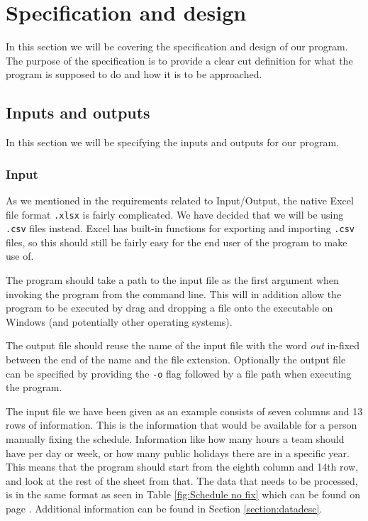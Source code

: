 \section{Specification and design}
In this section we will be covering the specification and design of our program. The purpose of the specification is to provide a clear cut definition for what the program is supposed to do and how it is to be approached.

\subsection{Inputs and outputs}
In this section we will be specifying the inputs and outputs for our program.

\subsubsection{Input}\label{InputSpec}
As we mentioned in the requirements related to Input/Output, the native Excel file format \verb|.xlsx| is fairly complicated. We have decided that we will be using \verb|.csv| files instead. Excel has built-in functions for exporting and importing \verb|.csv| files, so this should still be fairly easy for the end user of the program to make use of.

The program should take a path to the input file as the first argument when invoking the program from the command line. This will in addition allow the program to be executed by drag and dropping a file onto the executable on Windows (and potentially other operating systems).

The output file should reuse the name of the input file with the word \textit{out} in-fixed between the end of the name and the file extension. Optionally the output file can be specified by providing the \verb|-o| flag followed by a file path when executing the program.

The input file we have been given as an example consists of seven columns and 13 rows of information. This is the information that would be available for a person manually fixing the schedule. Information like how many hours a team should have per day or week, or how many public holidays there are in a specific year. This means that the program should start from the eighth column and 14th row, and look at the rest of the sheet from that. The data that needs to be processed, is in the same format as seen in Table \ref{fig:Schedule no fix} which can be found on page \pageref{fig:Schedule no fix}. Additional information can be found in Section \ref{section:datadesc}.

